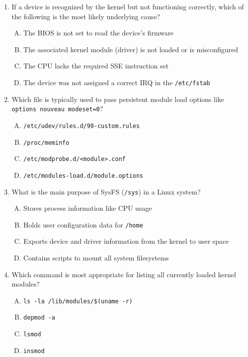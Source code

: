 \documentclass[a4paper]{report}
\begin{document}
\begin{enumerate}[1.]
\item If a device is recognized by the kernel but not functioning correctly, which of the following is the most likely underlying cause?
  \begin{enumerate}[A)]
    \item The BIOS is not set to read the device’s firmware
    \item The associated kernel module (driver) is not loaded or is misconfigured
    \item The CPU lacks the required SSE instruction set
    \item The device was not assigned a correct IRQ in the \texttt{/etc/fstab}
  \end{enumerate}

\item Which file is typically used to pass persistent module load options like \texttt{options nouveau modeset=0}?
  \begin{enumerate}[A)]
    \item \texttt{/etc/udev/rules.d/99-custom.rules}
    \item \texttt{/proc/meminfo}
    \item \texttt{/etc/modprobe.d/<module>.conf}
    \item \texttt{/etc/modules-load.d/module.options}
  \end{enumerate}

\item What is the main purpose of SysFS (\texttt{/sys}) in a Linux system?
  \begin{enumerate}[A)]
    \item Stores process information like CPU usage
    \item Holds user configuration data for \texttt{/home}
    \item Exports device and driver information from the kernel to user space
    \item Contains scripts to mount all system filesystems
  \end{enumerate}

\item Which command is most appropriate for listing all currently loaded kernel modules?
  \begin{enumerate}[A)]
    \item \texttt{ls -la /lib/modules/\$(uname -r)}
    \item \texttt{depmod -a}
    \item \texttt{lsmod}
    \item \texttt{insmod}
  \end{enumerate}


\end{enumerate}
\end{document}
